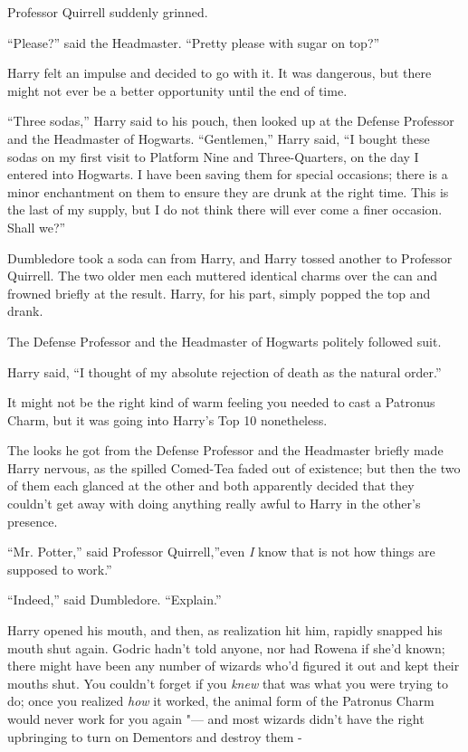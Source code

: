 Professor Quirrell suddenly grinned.

``Please?'' said the Headmaster. ``Pretty please with sugar on top?''

Harry felt an impulse and decided to go with it. It was dangerous, but
there might not ever be a better opportunity until the end of time.

``Three sodas,'' Harry said to his pouch, then looked up at the Defense
Professor and the Headmaster of Hogwarts. ``Gentlemen,'' Harry said, ``I
bought these sodas on my first visit to Platform Nine and
Three-Quarters, on the day I entered into Hogwarts. I have been saving
them for special occasions; there is a minor enchantment on them to
ensure they are drunk at the right time. This is the last of my supply,
but I do not think there will ever come a finer occasion. Shall we?''

Dumbledore took a soda can from Harry, and Harry tossed another to
Professor Quirrell. The two older men each muttered identical charms
over the can and frowned briefly at the result. Harry, for his part,
simply popped the top and drank.

The Defense Professor and the Headmaster of Hogwarts politely followed
suit.

Harry said, ``I thought of my absolute rejection of death as the natural
order.''

It might not be the right kind of warm feeling you needed to cast a
Patronus Charm, but it was going into Harry's Top 10 nonetheless.

The looks he got from the Defense Professor and the Headmaster briefly
made Harry nervous, as the spilled Comed-Tea faded out of existence; but
then the two of them each glanced at the other and both apparently
decided that they couldn't get away with doing anything really awful to
Harry in the other's presence.

``Mr. Potter,'' said Professor Quirrell,''even \emph{I} know that is not
how things are supposed to work.''

``Indeed,'' said Dumbledore. ``Explain.''

Harry opened his mouth, and then, as realization hit him, rapidly
snapped his mouth shut again. Godric hadn't told anyone, nor had Rowena
if she'd known; there might have been any number of wizards who'd
figured it out and kept their mouths shut. You couldn't forget if you
\emph{knew} that was what you were trying to do; once you realized
\emph{how} it worked, the animal form of the Patronus Charm would never
work for you again "--- and most wizards didn't have the right upbringing
to turn on Dementors and destroy them -

